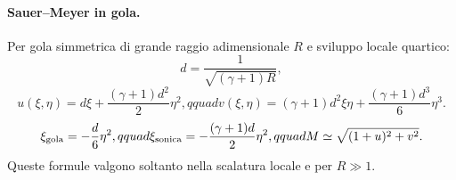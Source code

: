 \documentclass[11pt,a4paper]{article}
\begin{document}
\paragraph*{Sauer--Meyer in gola.}
Per gola simmetrica di grande raggio adimensionale $R$ e sviluppo locale quartico:
\[
d=\frac1{\sqrt{(\gamma+1)R}},
\]
\[
u(\xi,\eta)=d\xi+\frac{(\gamma+1)d^2}{2}\eta^2,qquad
v(\xi,\eta)=(\gamma+1)d^2\xi\eta+\frac{(\gamma+1)d^3}{6}\eta^3.
\]
\[
\xi_{\rm gola}=-\frac d6\eta^2,qquad
\xi_{\rm sonica}=-\frac{(\gamma+1)d}{2}\eta^2,qquad
M\simeq\sqrt{(1+u)^2+v^2}.
\]
Queste formule valgono soltanto nella scalatura locale e per $R\gg1$.
\end{document}
